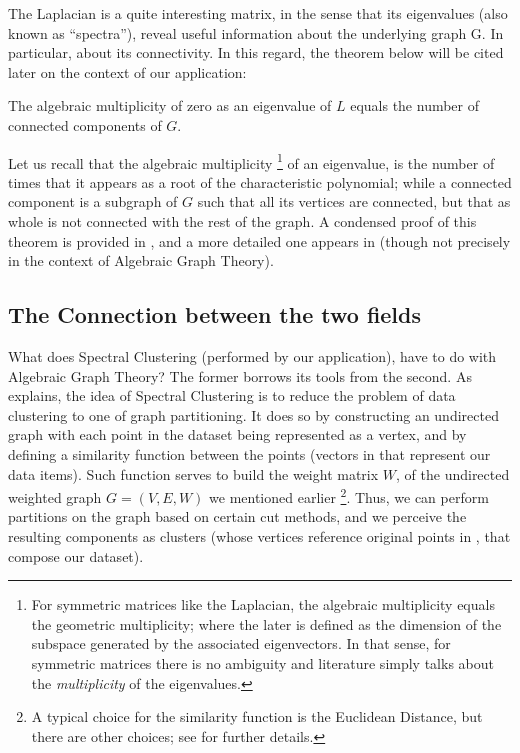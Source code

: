The Laplacian is a quite interesting matrix, in the sense that its
eigenvalues (also known as ``spectra''), reveal useful information about the
underlying graph G. In particular, about its connectivity. In this
regard, the theorem below will be cited later on the context of our
application: \\

\begin{theorem}
  \label{thm:speconn}
  The algebraic multiplicity of zero as an eigenvalue of $L$ equals
  the number of connected components of $G$.
\end{theorem}
\hfill

Let us recall that the algebraic multiplicity \footnote{For
  symmetric matrices like the Laplacian, the algebraic multiplicity
  equals the geometric multiplicity; where the later is defined as the
  dimension of the subspace generated by the associated
  eigenvectors. In that sense, for symmetric matrices there is 
  no ambiguity and literature simply talks about the \emph{multiplicity} of
  the eigenvalues.} of an eigenvalue, is the
number of times that it appears as a root of the characteristic
polynomial; while a connected component is a subgraph of
$G$ such that all its vertices are connected, but that as whole is not
connected with the rest of the graph. 
A condensed proof of this theorem is provided in
\cite{brouwer12}, and a more detailed one appears in \cite{luxburg07}
(though not precisely in the context of Algebraic Graph Theory). \\

\subsection{The Connection between the two fields}

What does Spectral Clustering (performed by our application), have to
do with Algebraic Graph Theory? The former borrows its tools from the
second. As \cite{jia14} explains, the idea of Spectral Clustering is
to reduce the problem of data clustering to one of graph
partitioning. It does so by constructing an undirected graph with each
point in the dataset being represented as a vertex, and by defining a
similarity function 
between the points (vectors in  that represent our data items). Such
function serves to build the weight matrix $W$, of the undirected weighted graph
$G = (V,E,W)$ we mentioned earlier \footnote{A typical choice
  for the similarity function is the Euclidean Distance, but there are
  other choices; see \cite{luxburg07} for further
  details.}. Thus, we can perform partitions on the graph
based on certain cut methods, and we perceive the resulting components as
clusters (whose vertices reference original points in , that
compose our dataset). \\

